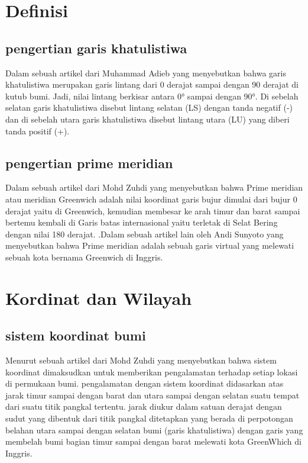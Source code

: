    
						

														   
\section {Definisi}

\subsection{pengertian garis khatulistiwa}	

	Dalam sebuah artikel dari Muhammad Adieb yang menyebutkan bahwa garis khatulistiwa merupakan garis lintang dari 0 derajat sampai dengan 90 derajat di kutub bumi. Jadi, nilai lintang berkisar antara 0° sampai dengan 90°. Di sebelah selatan garis khatulistiwa disebut lintang selatan (LS) dengan tanda negatif (-) dan di sebelah utara garis khatulistiwa disebut lintang utara (LU) yang diberi tanda positif (+)\cite{adieb2014studi}.

\subsection{pengertian prime meridian}
	
	Dalam sebuah artikel dari Mohd Zuhdi yang menyebutkan bahwa Prime meridian atau meridian Greenwich adalah nilai koordinat garis bujur dimulai dari bujur 0 derajat yaitu di Greenwich, kemudian membesar ke arah timur dan barat sampai bertemu kembali di Garis batas internasional yaitu terletak di Selat Bering dengan nilai 180 derajat. \cite {zuhdi2012sistem}.Dalam sebuah artikel lain oleh Andi Sunyoto yang menyebutkan bahwa Prime meridian adalah sebuah garis virtual yang melewati sebuah kota 
bernama Greenwich di Inggris\cite{sunyoto2009api}.

\section {Kordinat dan Wilayah}

\subsection{sistem koordinat bumi}
	
	Menurut sebuah artikel dari Mohd Zuhdi yang menyebutkan bahwa sistem koordinat dimaksudkan untuk memberikan pengalamatan terhadap setiap lokasi di permukaan bumi. pengalamatan dengan sistem koordinat didasarkan atas jarak timur sampai dengan barat dan utara sampai dengan selatan suatu tempat dari suatu titik pangkal tertentu. jarak diukur dalam satuan derajat dengan sudut yang dibentuk dari titik pangkal ditetapkan yang berada di perpotongan belahan utara sampai dengan selatan bumi (garis khatulistiwa) dengan garis yang membelah bumi bagian timur sampai dengan barat melewati kota GreenWhich di Inggris.

